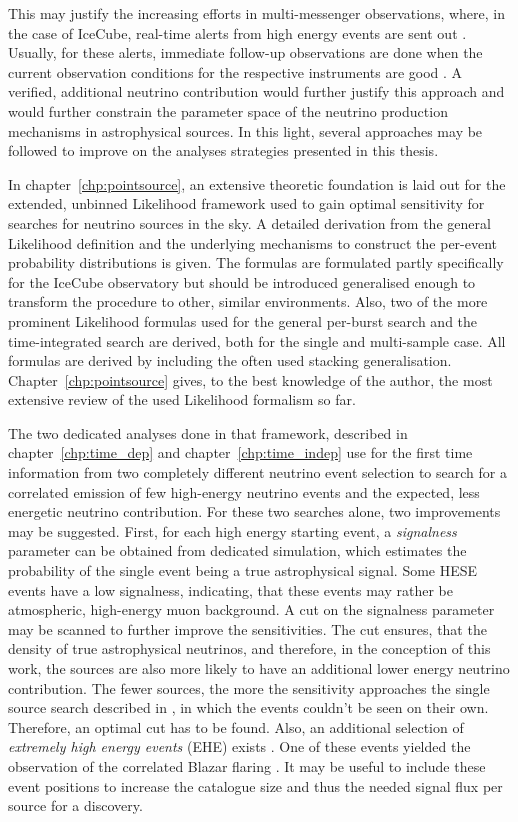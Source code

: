 This may justify the increasing efforts in multi-messenger observations, where, in the case of IceCube, real-time alerts from high energy events are sent out \cite{Aartsen:2016lmt}.
Usually, for these alerts, immediate follow-up observations are done when the current observation conditions for the respective instruments are good \cite{DeLotto:2017ggz}.
A verified, additional neutrino contribution would further justify this approach and would further constrain the parameter space of the neutrino production mechanisms in astrophysical sources.
In this light, several approaches may be followed to improve on the analyses strategies presented in this thesis.

In chapter~\ref{chp:pointsource}, an extensive theoretic foundation is laid out for the extended, unbinned Likelihood framework used to gain optimal sensitivity for searches for neutrino sources in the sky.
A detailed derivation from the general Likelihood definition and the underlying mechanisms to construct the per-event probability distributions is given.
The formulas are formulated partly specifically for the IceCube observatory but should be introduced generalised enough to transform the procedure to other, similar environments.
Also, two of the more prominent Likelihood formulas used for the general per-burst search and the time-integrated search are derived, both for the single and multi-sample case.
All formulas are derived by including the often used stacking generalisation.
Chapter~\ref{chp:pointsource} gives, to the best knowledge of the author, the most extensive review of the used Likelihood formalism so far.

The two dedicated analyses done in that framework, described in chapter~\ref{chp:time_dep} and chapter~\ref{chp:time_indep} use for the first time information from two completely different neutrino event selection to search for a correlated emission of few high-energy neutrino events and the expected, less energetic neutrino contribution.
For these two searches alone, two improvements may be suggested.
First, for each high energy starting event, a \emph{signalness} parameter can be obtained from dedicated simulation, which estimates the probability of the single event being a true astrophysical signal.
Some HESE events have a low signalness, indicating, that these events may rather be atmospheric, high-energy muon background.
A cut on the signalness parameter may be scanned to further improve the sensitivities.
The cut ensures, that the density of true astrophysical neutrinos, and therefore, in the conception of this work, the sources are also more likely to have an additional lower energy neutrino contribution.
The fewer sources, the more the sensitivity approaches the single source search described in \cite{Aartsen:2016oji}, in which the events couldn't be seen on their own.
Therefore, an optimal cut has to be found.
Also, an additional selection of \emph{extremely high energy events} (EHE) exists \cite{Yoshida:2017ghs,Aartsen:2016ngq}.
One of these events yielded the observation of the correlated Blazar flaring \cite{IceCube:2018cha}.
It may be useful to include these event positions to increase the catalogue size and thus the needed signal flux per source for a discovery.

